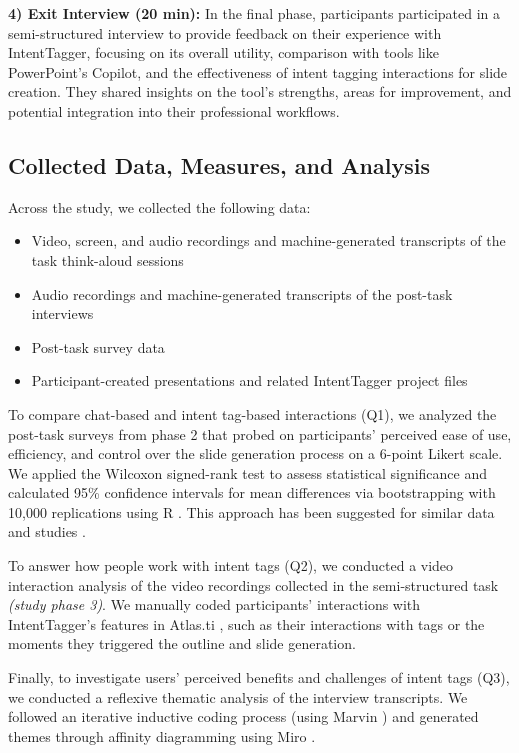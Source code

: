 \textbf{4) Exit Interview (20 min): }
In the final phase, participants participated in a semi-structured interview to provide feedback on their experience with IntentTagger, focusing on its overall utility, comparison with tools like PowerPoint’s Copilot, and the effectiveness of intent tagging interactions for slide creation. They shared insights on the tool’s strengths, areas for improvement, and potential integration into their professional workflows.



\subsection{Collected Data, Measures, and Analysis}

Across the study, we collected the following data:
\begin{itemize}
\item  Video, screen, and audio recordings and machine-generated transcripts of the task think-aloud sessions 
\item Audio recordings and machine-generated transcripts of the post-task interviews 
\item Post-task survey data
\item Participant-created presentations and related IntentTagger project files
\end{itemize}

To compare chat-based and intent tag-based interactions (Q1), we analyzed the post-task surveys from phase 2 that probed on participants' perceived ease of use, efficiency, and control over the slide generation process on a 6-point Likert scale. We applied the Wilcoxon signed-rank test to assess statistical significance and calculated 95\% confidence intervals for mean differences via bootstrapping with 10,000 replications using R \cite{rcoreteam_language_2024}. This approach has been suggested for similar data and studies \cite{zhu_assessing_2018, masson_statslator_2023}. 


To answer how people work with intent tags (Q2), we conducted a video interaction analysis \cite{baumer_comparing_2011} of the video recordings collected in the semi-structured task \textit{(study phase 3)}. We manually coded participants' interactions with IntentTagger's features in Atlas.ti \cite{atlas.ti_atlasti_2024}, such as their interactions with tags or the moments they triggered the outline and slide generation.  

Finally, to investigate users’ perceived benefits and challenges of intent tags (Q3), we conducted a reflexive thematic analysis \cite{braun_reflecting_2019} of the interview transcripts. We followed an iterative inductive coding process (using Marvin \cite{marvin_marvin_2024}) and generated themes through affinity diagramming using Miro \cite{miro_miro_2024}.
